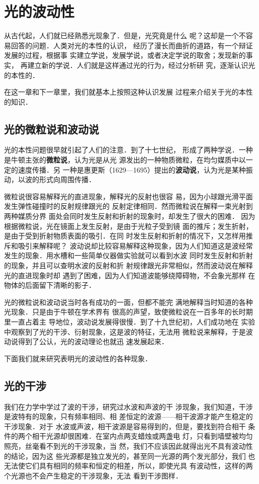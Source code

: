 \chapter{光的波动性}\label{chapter-wave-nature-of-light}

从古代起，人们就已经熟悉光现象了．但是，光究竟是什么
呢？这却是一个不容易回答的问题．人类对光的本性的认识，
经历了漫长而曲折的道路，有一个辩证发展的过程，根据事
实建立学说，发展学说，或者决定学说的取舍；发现新的事实，
再建立新的学说．人们就是这样通过光的行为，经过分析研
究，逐渐认识光的本性的．

在这一章和下一章里，我们就基本上按照这种认识发展
过程来介绍关于光的本性的知识．

\section{光的微粒说和波动说}
光的本性问题很早就引起了人们的注意．到了十七世纪，
形成了两种学说．一种是牛顿主张的\textbf{微粒说}，认为光是从光
源发出的一种物质微粒，在均匀媒质中以一定的速度传播．另
一种是惠更斯（1629—1695）提出的\textbf{波动说}，认为光是某种振
动，以波的形式向周围传播．

微粒说很容易解释光的直进现象，解释光的反射也很容
易，因为小球跟光滑平面发生弹性碰撞时的反射规律跟光的
反射定律相同．然而微粒说在解释一束光射到两种媒质分界
面处会同时发生反射和折射的现象时，却发生了很大的困难．
因为根据微粒说，光在镜面上发生反射，是由于光粒子受到镜
面的推斥；发生折射，是由于受到折射物质表面的吸引．在同
时发生反射和折射的情况下，又怎样用推斥和吸引来解释呢？
波动说却比较容易解释这种现象，因为人们知道这是波经常
发生的现象．用水槽和一些简单仪器做实验就可以看到水波
同时发生反射和折射的现象，并且可以查明水波的反射和折
射规律跟光非常相似，然而波动说在解释光的直进现象时却
遇到了困难，因为人们知道波能够绕障碍物，不会象光那样
在物体的后面留下清晰的影子．

光的微粒说和波动说当时各有成功的一面，但都不能完
满地解释当时知道的各种光现象．只是由于牛顿在学术界有
很高的声望，致使微粒说在一百多年的长时期里一直占着主
导地位，波动说发展得很慢．到了十九世纪初，人们成功地在
实验中观察到了光的干涉、衍射现象，这是波的特征，无法用
微粒说来解释，于是波动说得到了公认，光的波动理论也就迅
速发展起来．

下面我们就来研究表明光的波动性的各种现象．

\section{光的干涉}
我们在力学中学过了波的干涉，研究过水波和声波的干
涉现象，我们知道，干涉是波特有的现象，只有频率相同、相
差恒定的波源——相干波源才能产生稳定的干涉现象．对于
水波或声波，相干波源是容易得到的，但是，要找到符合相干
条件的两个相干光源却很困难．在室内点两支蜡烛或两盏电
灯，只看到墙壁被均匀照亮，丝毫看不到光的干涉现象，当
然，我们不应该因此就得出光不具有波动性的结论，因为这
些光源都是独立发光的，甚至同一光源的两个发光部分，我们
也无法使它们具有相同的频率和恒定的相差，所以，即使光具
有波动性，这样的两个光源也不会产生稳定的干涉现象，无法
看到干涉图样．


